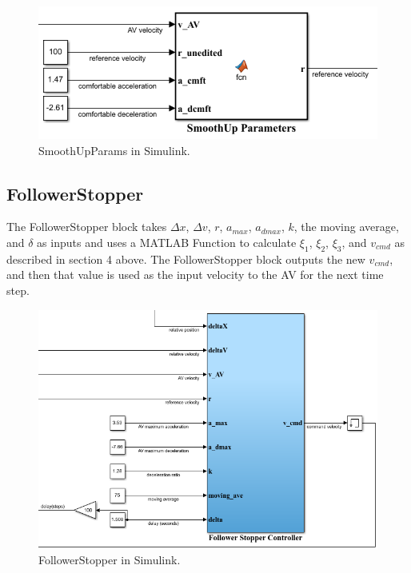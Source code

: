 \documentclass[conference]{IEEEtran}
\begin{document}
\begin{figure}[htbp]
\centerline{\includegraphics[width=3.5 in]{smoothupparams.png}}
\caption{SmoothUpParams in Simulink.}
\label{fig2}
\end{figure}

\subsection{FollowerStopper}
The FollowerStopper block takes $\Delta x$, $\Delta v$, $r$, $a_{max}$, $a_{dmax}$, $k$, the moving average, and $\delta$ as inputs and uses a MATLAB Function to calculate $\xi_1$, $\xi_2$, $\xi_3$, and $v_{cmd}$ as described in section 4 above. The FollowerStopper block outputs the new $v_{cmd}$, and then that value is used as the input velocity to the AV for the next time step.

\begin{figure}[htbp]
\centerline{\includegraphics[width=3.5 in]{followerstopper.png}}
\caption{FollowerStopper in Simulink.}
\label{fig2}
\end{figure}
\end{document}
